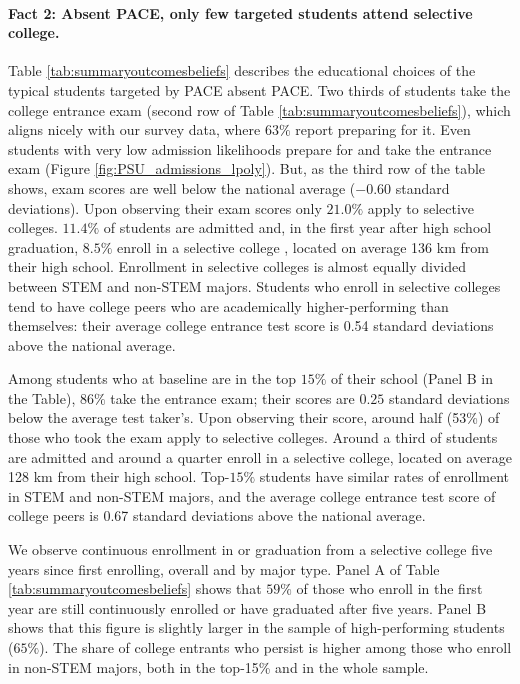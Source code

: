 \paragraph{Fact 2: Absent PACE, only few targeted students attend selective college.} Table \ref{tab:summaryoutcomesbeliefs} describes the educational choices of the typical students targeted by PACE absent PACE. Two thirds of students take the college entrance exam (second row of Table \ref{tab:summaryoutcomesbeliefs}), which aligns nicely with our survey data, where $63\%$ report preparing for it. Even students with very low admission likelihoods prepare for and take the entrance exam (Figure \ref{fig:PSU_admissions_lpoly}). But, as the third row of the table shows, exam scores are well below the national average ($-0.60$ standard deviations). Upon observing their exam scores only $21.0\%$ apply to selective colleges. $11.4\%$ of students are admitted and, in the first year after high school graduation, $8.5\%$ enroll in a selective college , located on average 136 km from their high school. Enrollment in selective colleges is almost equally divided between STEM and non-STEM majors. Students who enroll in selective colleges tend to have college peers who are academically higher-performing than themselves: their average college entrance test score is 0.54 standard deviations above the national average.\par 



 


Among students who at baseline are in the top $15\%$ of their school (Panel B in the Table), $86\%$ take the entrance exam; their scores are $0.25$ standard deviations below the average test taker's. Upon observing their score, around half (53\%) of those who took the exam apply to selective colleges. Around a third of students are admitted and around a quarter enroll in a selective college, located on average 128 km from their high school. Top-$15\%$ students have similar rates of enrollment in STEM and non-STEM majors, and the average college entrance test score of college peers is 0.67 standard deviations above the national average.\par 



We observe continuous enrollment in or graduation from a selective college five years since first enrolling, overall and by major type. Panel A of Table \ref{tab:summaryoutcomesbeliefs} shows that $59\%$ of those who enroll in the first year are still continuously enrolled or have graduated after five years. Panel B shows that this figure is slightly larger in the sample of high-performing students ($65\%$). The share of college entrants who persist is higher among those who enroll in non-STEM majors, both in the top-15\% and in the whole sample. \par 



